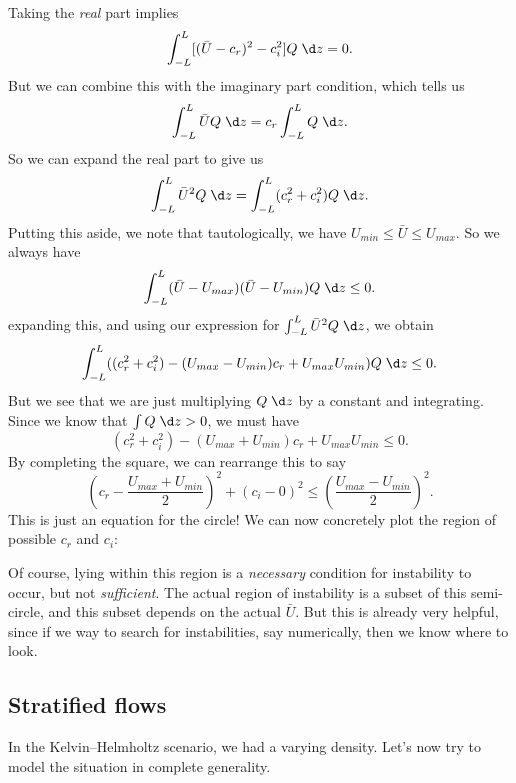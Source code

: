 \documentclass[a4paper]{article}
\begin{document}
Taking the \emph{real} part implies
\[
  \int_{-L}^L [(\bar{U} - c_r)^2 - c_i^2]Q \;\d z = 0.
\]
But we can combine this with the imaginary part condition, which tells us
\[
  \int_{-L}^L \bar{U} Q\;\d z = c_r \int_{-L}^L Q\;\d z.
\]
So we can expand the real part to give us
\[
  \int_{-L}^L \bar{U}^2 Q\;\d z = \int_{-L}^L (c_r^2 + c_i^2)Q\;\d z.
\]
Putting this aside, we note that tautologically, we have $U_{min} \leq \bar{U} \leq U_{max}$. So we always have
\[
  \int_{-L}^L (\bar{U} - U_{max}) (\bar{U} - U_{min}) Q \;\d z \leq 0.
\]
expanding this, and using our expression for $\int_{-L}^L \bar{U}^2 Q \;\d z$, we obtain
\[
  \int_{-L}^L ((c_r^2 + c_i^2) - (U_{max} - U_{min})c_r + U_{max} U_{min}) Q\;\d z \leq 0.
\]
But we see that we are just multiplying $Q\;\d z$ by a constant and integrating. Since we know that $\int Q\;\d z > 0$, we must have
\[
  (c_r^2 + c_i^2) - (U_{max} + U_{min})c_r + U_{max} U_{min} \leq 0.
\]
By completing the square, we can rearrange this to say
\[
  \left(c_r - \frac{U_{max} + U_{min}}{2}\right)^2 + (c_i - 0)^2 \leq \left(\frac{U_{max} - U_{min}}{2}\right)^2.
\]
This is just an equation for the circle! We can now concretely plot the region of possible $c_r$ and $c_i$:
\begin{center}
\end{center}
Of course, lying within this region is a \emph{necessary} condition for instability to occur, but not \emph{sufficient}. The actual region of instability is a subset of this semi-circle, and this subset depends on the actual $\bar{U}$. But this is already very helpful, since if we way to search for instabilities, say numerically, then we know where to look.

\subsection{Stratified flows}
In the Kelvin--Helmholtz scenario, we had a varying density. Let's now try to model the situation in complete generality.
\end{document}
